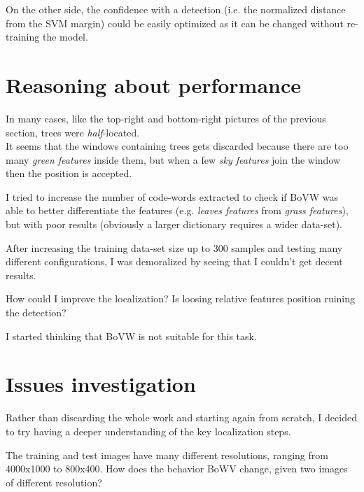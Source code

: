 \documentclass[]{report}
\begin{document}
On the other side, the confidence with a detection (i.e. the normalized distance from the SVM margin) could be easily optimized as it can be changed without re-training the model.

\section{Reasoning about performance}
In many cases, like the top-right and bottom-right pictures of the previous section, trees were \textit{half}-located. 
\\
It seems that the windows containing trees gets discarded because there are too many \textit{green features} inside them, but when a few \textit{sky features} join the window then the position is accepted.

I tried to increase the number of code-words extracted to check if BoVW was able to better differentiate the features (e.g.  \textit{leaves features} from \textit{grass features}), but with poor results (obviously a larger dictionary requires a wider data-set).

After increasing the training data-set size up to 300 samples and testing many different configurations, I was demoralized by seeing that I couldn't get decent results.

How could I improve the localization? Is loosing relative features position ruining the detection?

I started thinking that BoVW is not suitable for this task.

\section{Issues investigation}
Rather than discarding the whole work and starting again from scratch, I decided to try having a deeper understanding of the key localization steps.

The training and test images have many different resolutions, ranging from 4000x1000 to 800x400. How does the behavior BoWV change, given two images of different resolution?
\end{document}
